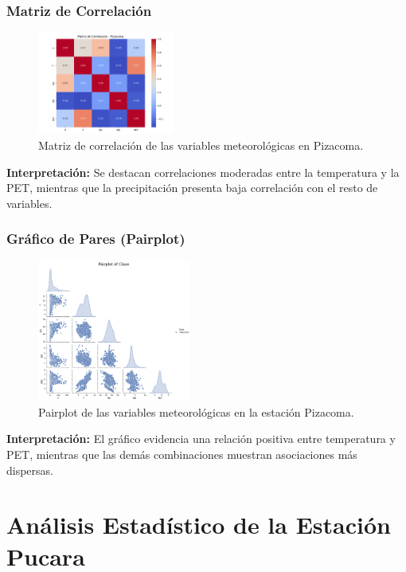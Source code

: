 \subsubsection*{Matriz de Correlación}
\begin{figure}[H]
\centering
\includegraphics[width=0.4\textwidth]{resultados/por_estacion_meteorologica/Pizacoma/matriz_correlacion.png}
\caption{Matriz de correlación de las variables meteorológicas en Pizacoma.}
\label{fig:pizacoma_corr}
\end{figure}
\textbf{Interpretación:} Se destacan correlaciones moderadas entre la temperatura y la PET, mientras que la precipitación presenta baja correlación con el resto de variables.

\subsubsection*{Gráfico de Pares (Pairplot)}
\begin{figure}[H]
\centering
\includegraphics[width=0.45\textwidth]{resultados/por_estacion_meteorologica/Pizacoma/pairplot.png}
\caption{Pairplot de las variables meteorológicas en la estación Pizacoma.}
\label{fig:pizacoma_pairplot}
\end{figure}
\textbf{Interpretación:} El gráfico evidencia una relación positiva entre temperatura y PET, mientras que las demás combinaciones muestran asociaciones más dispersas.


\section{Análisis Estadístico de la Estación Pucara}

